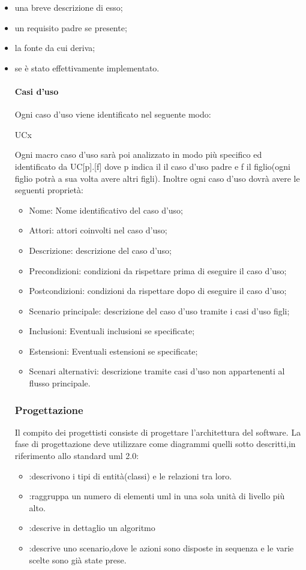 		\begin{itemize}
		\item una breve descrizione di esso;
		\item un requisito padre se presente;
		\item la fonte da cui deriva;
		\item se è stato effettivamente implementato.
		\paragraph{Casi d'uso}
		Ogni caso d'uso viene identificato nel seguente modo:
		\centerline{UCx}
		Ogni macro caso d'uso sarà poi analizzato in modo più specifico ed identificato da UC[p].[f] dove p indica il il caso d'uso padre e f il figlio(ogni figlio potrà a sua volta avere altri figli).
		Inoltre ogni caso d'uso dovrà avere le seguenti proprietà:
		\begin{itemize}
		\item Nome: Nome identificativo del caso d'uso;
		\item Attori: attori coinvolti nel caso d'uso;
		\item Descrizione: descrizione del caso d'uso;
		\item Precondizioni: condizioni da rispettare prima di eseguire il caso d'uso;%
		\item Postcondizioni: condizioni da rispettare dopo di eseguire il caso d'uso;%
		\item Scenario principale: descrizione del caso d'uso tramite i casi d'uso figli;
		\item Inclusioni: Eventuali inclusioni se specificate;
		\item Estensioni: Eventuali estensioni se specificate;
		\item Scenari alternativi: descrizione tramite casi d'uso non appartenenti al flusso principale.
		\end{itemize}
	\subsubsection{Progettazione}
	Il compito dei progettisti consiste di progettare l'architettura del software. %
	La fase di progettazione deve utilizzare come diagrammi  quelli sotto descritti,in riferimento allo standard uml 2.0:
	\begin{itemize}
		\item {}:descrivono i tipi di entità(classi) e le relazioni tra loro.
		\item {}:raggruppa un numero di elementi uml in una sola unità di livello più alto.
		\item {}:descrive in dettaglio un algoritmo
		\item {}:descrive uno scenario,dove le azioni sono disposte in sequenza e le varie scelte sono già state prese.
		\end{itemize}

\end{itemize}
